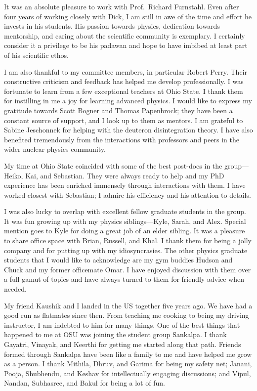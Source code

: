 \begin{acknowledgments}

  It was an absolute pleasure to work with Prof.\ Richard Furnstahl.  Even after
  four years of working closely with Dick, I am still in awe of the time and
  effort he invests in his students.  His passion towards physics, dedication
  towards mentorship, and caring about the scientific community is exemplary.
  I certainly consider it a privilege to be his padawan and hope to have
  imbibed at least part of his scientific ethos.

  I am also thankful to my committee members, in particular Robert
  Perry.  Their constructive criticism and feedback has helped me develop
  professionally.  I was fortunate to learn from a few exceptional
  teachers at Ohio State.  I thank them for instilling in me a joy for learning
  advanced physics.  I would like to express my gratitude towards
  Scott Bogner and Thomas Papenbrock; they have been a constant source of
  support, and I look up to them as mentors.  I am grateful to
  Sabine Jeschonnek for helping with the deuteron disintegration theory.
  I have also benefited tremendously from the interactions with professors
  and peers in the wider nuclear physics community.

  My time at Ohio State coincided with some of the best
  post-docs in the group---Heiko, Kai, and Sebastian.  They were always ready
  to help and my PhD experience has
  been enriched immensely through interactions with them.  I have worked
  closest with Sebastian; I admire his efficiency and his attention to details.

  I was also lucky to overlap with excellent fellow graduate students in the group.
  It was fun growing up with my physics siblings---Kyle, Sarah, and Alex.
  Special mention goes to Kyle for doing a great job of an elder sibling.
  It was a pleasure to share office space with Brian, Russell, and Khal.
  I thank them for being a jolly company and for putting up with my
  idiosyncrasies.  The other physics graduate students that I would like
  to acknowledge are my gym buddies Hudson and Chuck and my former officemate
  Omar.  I have enjoyed discussion with them over a full gamut of topics and
  have always turned to them for friendly advice when needed.

  My friend Kaushik and I landed in the US together five years ago.  We have had
  a good run as flatmates since then.  From teaching me cooking to being my
  driving
  instructor, I am indebted to him for many things.  One of the best things
  that happened to me at OSU was joining the student group Sankalpa.  I thank
  Gayatri, Vinayak, and Keerthi for getting me started along that path.
  Friends formed through Sankalpa have been like a family to me and have
  helped me grow as a person.  I thank Mithila, Dhruv, and Garima for being
  my safety net; Janani, Pooja, Shubhendu, and Keshav for intellectually
  engaging discussions; and Vipul, Nandan, Subhasree, and Bakul for being
  a lot of fun.


\end{acknowledgments}
